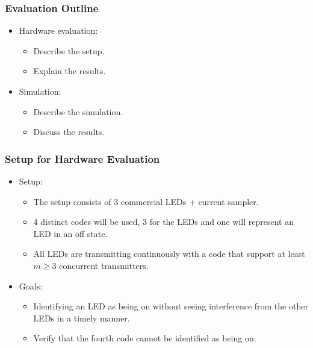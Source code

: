 \documentclass{beamer}
\begin{document}
	\begin{frame}\frametitle{Evaluation Outline}
		

		\begin{itemize}

			\item Hardware evaluation:
			\begin{itemize}

				\item Describe the setup.
				\item Explain the results.
			
			\end{itemize}

			\item Simulation:
			\begin{itemize}
				\item Describe the simulation.
				\item Discuss the results.
			\end{itemize}




		\end{itemize}
	\end{frame}





	\begin{frame}\frametitle{Setup for Hardware Evaluation}
		

		\begin{itemize}

			\item Setup: 
			\begin{itemize}
				\item The setup consists of 3 commercial LEDs + current sampler.

				\item 4 distinct codes will be used, 3 for the LEDs and one will represent an LED in an off state.

				\item All LEDs are transmitting continuously with a code that support at least $m \ge 3$ concurrent transmitters.
			\end{itemize}

			\item Goals:
			\begin{itemize}
				\item Identifying an LED as being on without seeing interference from the other LEDs in a timely manner.

				\item Verify that the fourth code cannot be identified as being on. 

			\end{itemize}



		\end{itemize}
	\end{frame}
\end{document}
